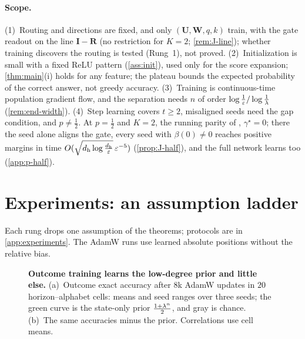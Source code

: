 \paragraph{Scope.} (1)~Routing and directions are fixed, and only $(\mathbf U,\mathbf W,q,k)$ train, with the gate readout on the line
$\mathbf I-\mathbf R$ (no restriction for $K=2$; \cref{rem:J-line}); whether training discovers the routing is tested (Rung~1), not proved.
(2)~Initialization is small with a fixed ReLU pattern (\cref{ass:init}), used only for the score expansion; \cref{thm:main}(i) holds for any feature; the plateau bounds the expected probability of the correct answer,
not greedy accuracy. (3)~Training is continuous-time population gradient flow, and the separation needs $n$ of order
$\log\frac1{\varepsilon}/\log\frac1{\lambda}$ (\cref{rem:end-width}). (4)~Step learning covers $t\ge2$, misaligned seeds need the gap condition, and
$p\ne\frac12$. At $p=\frac12$ and $K=2$, the running parity of \citet{kim2024parity}, $\gamma^\star=0$; there the seed alone aligns the gate, every seed with $\beta(0)\ne0$
reaches positive margins in time $O(\sqrt{d_{\mathrm h}\log\frac{d_{\mathrm h}}{\varepsilon}}\,\varepsilon^{-5})$ (\cref{prop:J-half}), and the full network learns too (\cref{app:p-half}).

\suppressfloats[t]
\section{Experiments: an assumption ladder}
\label{sec:experiments}
\label{sec:validation}

Each rung drops one assumption of the theorems; protocols are in \cref{app:experiments}. The AdamW runs use learned absolute positions
without the relative bias.

\begin{figure}[t]
\centering
\resizebox{\linewidth}{!}{}
\caption{\textbf{Outcome training learns the low-degree prior and little else.}
(a)~Outcome exact accuracy after $8$k AdamW updates in $20$ horizon--alphabet cells: means and seed ranges over three seeds; the green curve is the state-only prior $\frac{1+\lambda^n}{2}$, and gray is chance.
(b)~The same accuracies minus the prior. Correlations use cell means.}
\label{fig:theory-measurement}
\label{fig:lambda-grid}
\end{figure}

